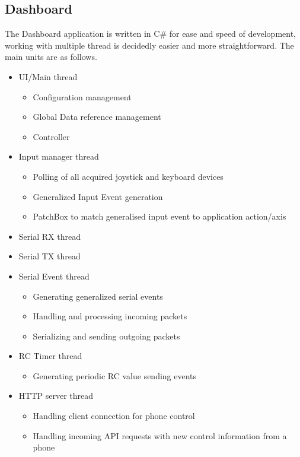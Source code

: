 \documentclass[final]{article}
\begin{document}
\subsection{Dashboard}
The Dashboard application is written in C\# for ease and speed of development, working with multiple thread is decidedly easier and more straightforward.
The main units are as follows.
\begin{itemize}
 \item UI/Main thread
 \begin{itemize}
    \item Configuration management
    \item Global Data reference management
    \item Controller
 \end{itemize}
 \item Input manager thread
 \begin{itemize}
    \item Polling of all acquired joystick and keyboard devices
    \item Generalized Input Event generation
    \item PatchBox to match generalised input event to application action/axis
 \end{itemize}
 \item Serial RX thread
 \item Serial TX thread
 \item Serial Event thread
 \begin{itemize}
    \item Generating generalized serial events
    \item Handling and processing incoming packets
    \item Serializing and sending outgoing packets
 \end{itemize}
 \item RC Timer thread
 \begin{itemize}
    \item Generating periodic RC value sending events
 \end{itemize}
 \item HTTP server thread
 \begin{itemize}
    \item Handling client connection for phone control
    \item Handling incoming API requests with new control information from a phone
 \end{itemize}

\end{itemize}
\end{document}
